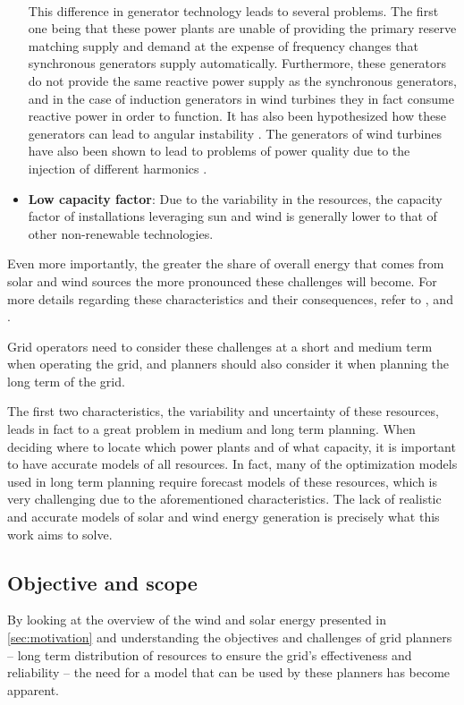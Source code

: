 \begin{itemize}
    \\This difference in generator technology leads to several problems. The first one being that these power plants are unable of providing the primary reserve matching supply and demand at the expense of frequency changes that synchronous generators supply automatically. Furthermore, these generators do not provide the same reactive power supply as the synchronous generators, and in the case of induction generators in wind turbines they in fact consume reactive power in order to function. It has also been hypothesized how these generators can lead to angular instability \cite{vittal_raja_ayyanar_2023}. The generators of wind turbines have also been shown to lead to problems of power quality due to the injection of different harmonics \cite{muljadi_butterfield_chacon_romanowitz_2006}. 
    \item \textbf{Low capacity factor}: Due to the variability in the resources, the capacity factor of installations leveraging sun and wind is generally lower to that of other non-renewable technologies. 
\end{itemize}

Even more importantly, the greater the share of overall energy that comes from solar and wind sources the more pronounced these challenges will become. For more details regarding these characteristics and their consequences, refer to \cite{ahmed_fahad_2020}, \cite{kumar_pandey_sinha_2016} and \cite{steen_goop_2014}.

Grid operators need to consider these challenges at a short and medium term when operating the grid, and planners should also consider it when planning the long term of the grid. 

The first two characteristics, the variability and uncertainty of these resources, leads in fact to a great problem in medium and long term planning. When deciding where to locate which power plants and of what capacity, it is important to have accurate models of all resources. In fact, many of the optimization models used in long term planning require forecast models of these resources, which is very challenging due to the aforementioned characteristics. The lack of realistic and accurate models of solar and wind energy generation is precisely what this work aims to solve.

\subsection{Objective and scope}
\label{sec:objective-and-scope}
By looking at the overview of the wind and solar energy presented in \autoref{sec:motivation}  and understanding the objectives and challenges of grid planners -- long term distribution of resources to ensure the grid's effectiveness and reliability -- the need for a model that can be used by these planners has become apparent. 

